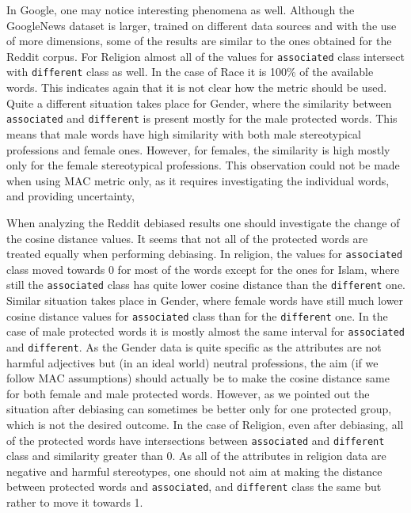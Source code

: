 \documentclass[12pt,]{book}
\begin{document}
In Google, one may notice interesting phenomena as well. Although the
GoogleNews dataset is larger, trained on different data sources and with
the use of more dimensions, some of the results are similar to the ones
obtained for the Reddit corpus. For Religion almost all of the values
for \texttt{associated} class intersect with \texttt{different} class as
well. In the case of Race it is 100\% of the available words. This
indicates again that it is not clear how the metric should be used.
Quite a different situation takes place for Gender, where the similarity
between \texttt{associated} and \texttt{different} is present mostly for
the male protected words. This means that male words have high
similarity with both male stereotypical professions and female ones.
However, for females, the similarity is high mostly only for the female
stereotypical professions. This observation could not be made when using
MAC metric only, as it requires investigating the individual words, and
providing uncertainty,

When analyzing the Reddit debiased results one should investigate the
change of the cosine distance values. It seems that not all of the
protected words are treated equally when performing debiasing. In
religion, the values for \texttt{associated} class moved towards 0 for
most of the words except for the ones for Islam, where still the
\texttt{associated} class has quite lower cosine distance than the
\texttt{different} one. Similar situation takes place in Gender, where
female words have still much lower cosine distance values for
\texttt{associated} class than for the \texttt{different} one. In the
case of male protected words it is mostly almost the same interval for
\texttt{associated} and \texttt{different}. As the Gender data is quite
specific as the attributes are not harmful adjectives but (in an ideal
world) neutral professions, the aim (if we follow MAC assumptions)
should actually be to make the cosine distance same for both female and
male protected words. However, as we pointed out the situation after
debiasing can sometimes be better only for one protected group, which is
not the desired outcome. In the case of Religion, even after debiasing,
all of the protected words have intersections between
\texttt{associated} and \texttt{different} class and similarity greater
than 0. As all of the attributes in religion data are negative and
harmful stereotypes, one should not aim at making the distance between
protected words and \texttt{associated}, and \texttt{different} class
the same but rather to move it towards 1.
\end{document}
